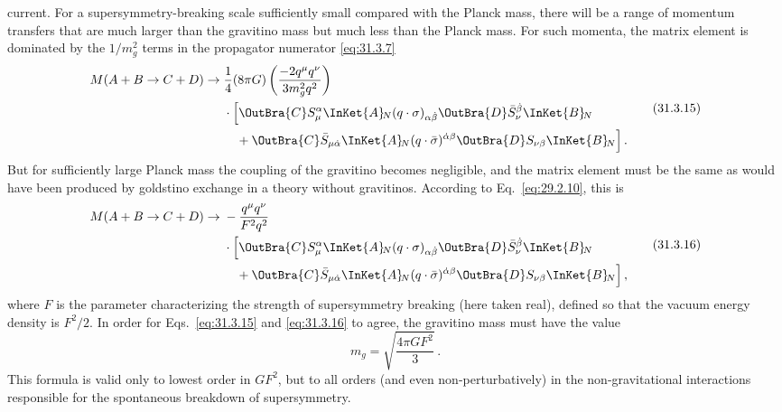 current. For a supersymmetry-breaking scale sufficiently small compared
with the Planck mass, there will be a range of momentum transfers that are
much larger than the gravitino mass but much less than the Planck mass.
For such momenta, the matrix element is dominated by the \(1/m_g^2\)
terms in the propagator numerator \eqref{eq:31.3.7}
\begin{equation}
  \begin{aligned}
  M(A+B\to C+D)\to{}&
  \frac14(8\pi G)
  \left(\frac{-2q^\mu q^\nu}{3m_g^2q^2}\right)\\
  &{}\cdot
  \Bigl[
    \OutBra{C}S_\mu^\alpha\InKet{A}\!{}_{N}
      (q\cdot\sigma)_{\alpha\dot\beta}
      \OutBra{D}\bar S_\nu^{\dot\beta}\InKet{B}\!{}_{N}\\
  &\quad
   +\OutBra{C}\bar S_{\mu\dot\alpha}\InKet{A}\!{}_{N}
      (q\cdot\bar\sigma)^{\dot\alpha\beta}
      \OutBra{D}S_{\nu\beta}\InKet{B}\!{}_{N}
  \Bigr]\,.
  \end{aligned}
  \tag{31.3.15}\label{eq:31.3.15}
\end{equation}
But for sufficiently large Planck mass the coupling of the gravitino
becomes negligible, and the matrix element must be the same as would have
been produced by goldstino exchange in a theory without gravitinos.
According to Eq.~\eqref{eq:29.2.10}, this is
\begin{equation}
  \begin{aligned}
  M(A+B\to C+D)\to{}&
  -\frac{q^\mu q^\nu}{F^2q^2}\\
  &{}\cdot
  \Bigl[
    \OutBra{C}S_\mu^\alpha\InKet{A}\!{}_{N}
      (q\cdot\sigma)_{\alpha\dot\beta}
      \OutBra{D}\bar S_\nu^{\dot\beta}\InKet{B}\!{}_{N}\\
  &\quad
   +\OutBra{C}\bar S_{\mu\dot\alpha}\InKet{A}\!{}_{N}
      (q\cdot\bar\sigma)^{\dot\alpha\beta}
      \OutBra{D}S_{\nu\beta}\InKet{B}\!{}_{N}
  \Bigr]\,,
  \end{aligned}
  \tag{31.3.16}\label{eq:31.3.16}
\end{equation}
where \(F\) is the parameter characterizing the strength of supersymmetry
breaking (here taken real), defined so that the vacuum energy density is
\(F^2/2\). In order for Eqs.~\eqref{eq:31.3.15} and
\eqref{eq:31.3.16} to agree, the gravitino mass must have the value
\begin{equation}
  m_g=\sqrt{\frac{4\pi G F^2}{3}}\,.
  \tag{31.3.17}\label{eq:31.3.17}
\end{equation}
This formula is valid only to lowest order in \(GF^2\), but to all orders
(and even non-perturbatively) in the non-gravitational interactions
responsible for the spontaneous breakdown of supersymmetry.

